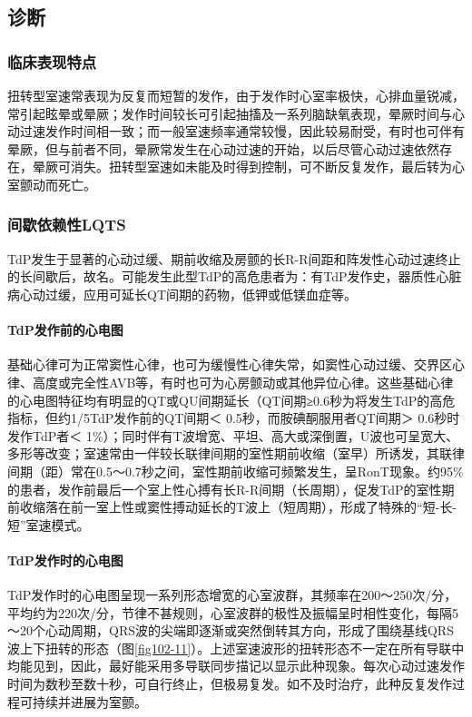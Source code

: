 \subsection{诊断}

\subsubsection{临床表现特点}

扭转型室速常表现为反复而短暂的发作，由于发作时心室率极快，心排血量锐减，常引起眩晕或晕厥；发作时间较长可引起抽搐及一系列脑缺氧表现，晕厥时间与心动过速发作时间相一致；而一般室速频率通常较慢，因此较易耐受，有时也可伴有晕厥，但与前者不同，晕厥常发生在心动过速的开始，以后尽管心动过速依然存在，晕厥可消失。扭转型室速如未能及时得到控制，可不断反复发作，最后转为心室颤动而死亡。

\subsubsection{间歇依赖性LQTS}

TdP发生于显著的心动过缓、期前收缩及房颤的长R-R间距和阵发性心动过速终止的长间歇后，故名。可能发生此型TdP的高危患者为：有TdP发作史，器质性心脏病心动过缓，应用可延长QT间期的药物，低钾或低镁血症等。

\paragraph{TdP发作前的心电图}

基础心律可为正常窦性心律，也可为缓慢性心律失常，如窦性心动过缓、交界区心律、高度或完全性AVB等，有时也可为心房颤动或其他异位心律。这些基础心律的心电图特征均有明显的QT或QU间期延长（QT间期≥0.6秒为将发生TdP的高危指标，但约1/5TdP发作前的QT间期＜
0.5秒，而胺碘酮服用者QT间期＞ 0.6秒时发作TdP者＜
1\%）；同时伴有T波增宽、平坦、高大或深倒置，U波也可呈宽大、多形等改变；室速常由一伴较长联律间期的室性期前收缩（室早）所诱发，其联律间期（距）常在0.5～0.7秒之间，室性期前收缩可频繁发生，呈RonT现象。约95\%的患者，发作前最后一个室上性心搏有长R-R间期（长周期），促发TdP的室性期前收缩落在前一室上性或窦性搏动延长的T波上（短周期），形成了特殊的“短-长-短”室速模式。

\paragraph{TdP发作时的心电图}

TdP发作时的心电图呈现一系列形态增宽的心室波群，其频率在200～250次/分，平均约为220次/分，节律不甚规则，心室波群的极性及振幅呈时相性变化，每隔5～20个心动周期，QRS波的尖端即逐渐或突然倒转其方向，形成了围绕基线QRS波上下扭转的形态（图\ref{fig102-11}）。上述室速波形的扭转形态不一定在所有导联中均能见到，因此，最好能采用多导联同步描记以显示此种现象。每次心动过速发作时间为数秒至数十秒，可自行终止，但极易复发。如不及时治疗，此种反复发作过程可持续并进展为室颤。

